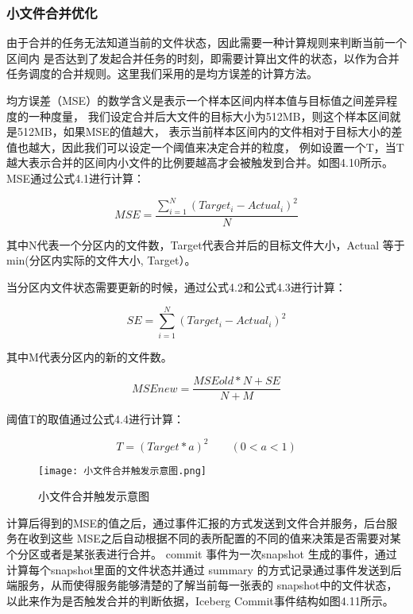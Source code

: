 \subsubsection{小文件合并优化}

由于合并的任务无法知道当前的文件状态，因此需要一种计算规则来判断当前一个区间内
是否达到了发起合并任务的时刻，即需要计算出文件的状态，以作为合并任务调度的合并规则。这里我们采用的是均方误差的计算方法。

均方误差（MSE）的数学含义是表示一个样本区间内样本值与目标值之间差异程度的一种度量，
我们设定合并后大文件的目标大小为512MB，则这个样本区间就是512MB，如果MSE的值越大，
表示当前样本区间内的文件相对于目标大小的差值也越大，因此我们可以设定一个阈值来决定合并的粒度，
例如设置一个T，当T 越大表示合并的区间内小文件的比例要越高才会被触发到合并。如图4.10所示。
MSE通过公式4.1进行计算：

\begin{equation}
  MSE=\frac {\sum_{i=1}^{N}{(Target_i - Actual_i)^2}} {N}
  \label{eq:example}
\end{equation}

其中N代表一个分区内的文件数，Target代表合并后的目标文件大小，Actual 等于min(分区内实际的文件大小, Target）。

当分区内文件状态需要更新的时候，通过公式4.2和公式4.3进行计算：

\begin{equation}
  SE=\sum_{i=1}^{N}{(Target_i - Actual_i)^2}
  \label{eq:example}
\end{equation}

其中M代表分区内的新的文件数。

\begin{equation}
  MSEnew=\frac {MSEold*N+SE} {N+M}
  \label{eq:example}
\end{equation}

阈值T的取值通过公式4.4进行计算：

\begin{equation}
  T=(Target*a)^2 \qquad (0<a<1)
  \label{eq:example}
\end{equation}

\begin{figure}[h]
  \centering
  \texttt{[image: 小文件合并触发示意图.png]}
  \caption{小文件合并触发示意图}
  \label{fig:badge}
\end{figure}

计算后得到的MSE的值之后，通过事件汇报的方式发送到文件合并服务，后台服务在收到这些
MSE之后自动根据不同的表所配置的不同的值来决策是否需要对某个分区或者是某张表进行合并。
commit 事件为一次snapshot 生成的事件，通过计算每个snapshot里面的文件状态并通过
summary 的方式记录通过事件发送到后端服务，从而使得服务能够清楚的了解当前每一张表的
snapshot中的文件状态，以此来作为是否触发合并的判断依据，Iceberg Commit事件结构如图4.11所示。

